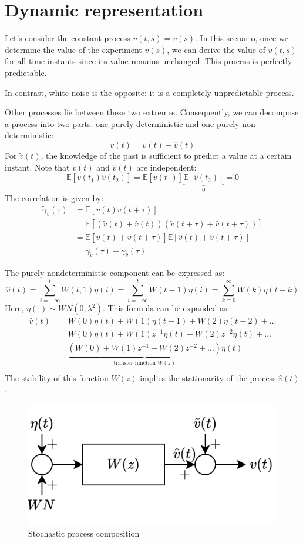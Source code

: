 \section{Dynamic representation}

Let's consider the constant process $v(t,s)=v(s)$. 
In this scenario, once we determine the value of the experiment $v(s)$, we can derive the value of $v(t,s)$ for all time instants since its value remains unchanged.
This process is perfectly predictable.

In contrast, white noise is the opposite: it is a completely unpredictable process. 

Other processes lie between these two extremes.
Consequently, we can decompose a process into two parts: one purely deterministic and one purely non-deterministic:
\[v(t)=\tilde{v}(t)+\hat{v}(t)\]
For $\tilde{v}(t)$, the knowledge of the past is sufficient to predict a value at a certain instant.
Note that $\tilde{v}(t)$ and $\hat{v}(t)$ are independent: 
\[\mathbb{E}\left[ \tilde{v}(t_1)\hat{v}(t_2) \right]=\mathbb{E}\left[ \tilde{v}(t_1)\right]\underbrace{\mathbb{E}\left[\hat{v}(t_2) \right]}_0 =0\]
The correlation is given by:
\begin{align*}
    \tilde{\gamma}_v(\tau)  &=\mathbb{E}\left[v(t)v(t+\tau)\right] \\
                            &=\mathbb{E}\left[\left(\tilde{v}(t)+\hat{v}(t)\right)\left(\tilde{v}(t+\tau)+\hat{v}(t+\tau)\right)\right] \\
                            &=\mathbb{E}\left[\tilde{v}(t)+\tilde{v}(t+\tau)\right]\mathbb{E}\left[\hat{v}(t)+\hat{v}(t+\tau)\right] \\
                            &=\tilde{\gamma}_{\tilde{v}}(\tau)+\tilde{\gamma}_{\hat{v}}(\tau)
\end{align*}

The purely nondeterministic component can be expressed as:
\[\hat{v}(t)=\sum_{i=-\infty}^{t}W(t,1)\eta(i)=\sum_{i=-\infty}^{t}W(t-1)\eta(i)=\sum_{k=0}^\infty W(k)\eta(t-k)\]
Here, $\eta(\cdot) \sim WN(0,\lambda^2)$. 
This formula can be expanded as:
\begin{align*}
\hat{v}(t)  &= W(0)\eta(t) + W(1)\eta(t-1) + W(2)\eta(t-2) + \dots \\
                &= W(0)\eta(t) + W(1)z^{-1}\eta(t) + W(2)z^{-2}\eta(t) + \dots \\
                &= \underbrace{\left(W(0) + W(1)z^{-1} + W(2)z^{-2} + \dots\right)}_{\text{transfer function }W(z)} \eta(t)  \\
\end{align*}
The stability of this function $W(z)$ implies the stationarity of the process $\hat{v}(t)$.
\begin{figure}[H]
    \centering
    \includegraphics[width=0.4\linewidth]{images/dynamic.png} 
    \caption{Stochastic process composition}
\end{figure}